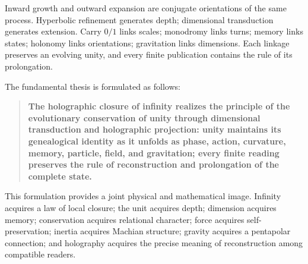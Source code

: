 Inward growth and outward expansion are conjugate orientations of the same process. Hyperbolic refinement generates depth; dimensional transduction generates extension. Carry \(0/1\) links scales; monodromy links turns; memory links states; holonomy links orientations; gravitation links dimensions. Each linkage preserves an evolving unity, and every finite publication contains the rule of its prolongation.

The fundamental thesis is formulated as follows:

\begin{quote}
\textbf{The holographic closure of infinity realizes the principle of the evolutionary conservation of unity through dimensional transduction and holographic projection: unity maintains its genealogical identity as it unfolds as phase, action, curvature, memory, particle, field, and gravitation; every finite reading preserves the rule of reconstruction and prolongation of the complete state.}
\end{quote}

This formulation provides a joint physical and mathematical image. Infinity acquires a law of local closure; the unit acquires depth; dimension acquires memory; conservation acquires relational character; force acquires self-preservation; inertia acquires Machian structure; gravity acquires a pentapolar connection; and holography acquires the precise meaning of reconstruction among compatible readers.
